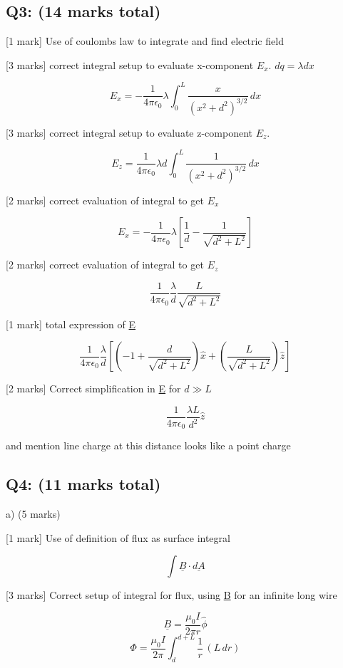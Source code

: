 \documentclass[a4paper,11pt]{article}
\begin{document}
\subsection*{Q3: (14 marks total)}

[1 mark] Use of coulombs law to integrate and find electric field

[3 marks] correct integral setup to evaluate x-component \( E_x \). \( dq = \lambda dx \)

\[ E_x = - \frac{1}{4\pi \epsilon_0} \lambda \int_{0}^{L} \frac{x}{(x^2+d^2)^{3/2}} \, dx \]

[3 marks] correct integral setup to evaluate z-component \( E_z \).

\[ E_z = \frac{1}{4\pi \epsilon_0} \lambda d  \int_{0}^{L} \frac{1}{(x^2+d^2)^{3/2}} \, dx \]

[2 marks] correct evaluation of integral to get \( E_x \)

\[ E_x = -\frac{1}{4 \pi \epsilon_0} \lambda \left [ \frac{1}{d} - \frac{1}{\sqrt{d^2+L^2}} \right ] \]

[2 marks] correct evaluation of integral to get \( E_z \)

\[ \frac{1}{4 \pi \epsilon_0} \frac{\lambda}{d} \frac{L}{\sqrt{d^2+L^2}} \]

[1 mark] total expression of \underline{E}

\[
\frac{1}{4 \pi \epsilon_0} \frac{\lambda}{d} \left [ \left ( -1+\frac{d}{\sqrt{d^2+L^2}} \right ) \hat{x} +\left ( \frac{L}{\sqrt{d^2+L^2}} \right ) \hat{z} \right ]
\]

[2 marks] Correct simplification in \underline{E} for \( d \gg L \)

\[ \frac{1}{4 \pi \epsilon_0} \frac{\lambda L}{d^2} \hat{z} \]

and mention line charge at this distance looks like a point charge

\subsection*{Q4: (11 marks total)}

a) (5 marks)

[1 mark] Use of definition of flux as surface integral

\[ \int \underline{B} \cdot \underline{dA} \]

[3 marks] Correct setup of integral for flux, using \underline{B} for an infinite long wire 
 
\[ \underline{B} = \frac{\mu_0 I}{2\pi r} \hat{\phi} \]
\[ \Phi = \frac{\mu_0 I}{2\pi} \int_{d}^{d+L} \frac{1}{r} \, (L \, dr) \]
\end{document}
